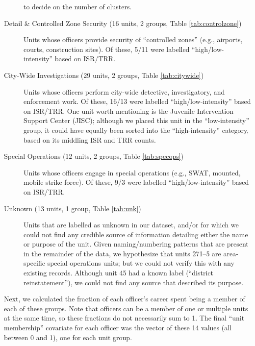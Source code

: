 \begin{description}
to decide on the number of clusters.
%
\item[Detail \& Controlled Zone Security (16 units, 2 groups, Table \ref{tab:controlzone}) ] Units whose officers
provide security of ``controlled zones'' (e.g., airports, courts, construction sites). Of these,
5/11 were labelled ``high/low-intensity'' {\color{red} based on ISR/TRR}.
%
\item[City-Wide Investigations (29 units, 2 groups, Table \ref{tab:citywide})] Units whose officers
perform city-wide detective, investigatory, and enforcement work. 
Of these, 16/13 were labelled ``high/low-intensity'' {\color{red} based on ISR/TRR}.
One unit worth mentioning is the Juvenile Intervention Support Center (JISC); although
we placed this unit in the ``low-intensity'' group, it 
could have equally been sorted into the ``high-intensity'' category, based
on its middling ISR and TRR counts.
%
\item[Special Operations (12 units, 2 groups, Table \ref{tab:specops})] Units whose officers
engage in special operations (e.g., SWAT, mounted, mobile strike force).
Of these, 9/3 were labelled ``high/low-intensity'' {\color{red} based on ISR/TRR}.
%
\item[Unknown (13 units, 1 group, Table \ref{tab:unk})] Units that are labelled as unknown in our dataset, and/or for which
we could not find any credible source of information detailing either the name or purpose of the unit. Given
naming/numbering patterns that are present in the remainder of the data, we hypothesize that units 271--5 are 
area-specific special operations units; but we could not verify this with any existing records. Although unit 45 had
a known label (``district reinstatement''), we could not find any source that described its purpose.

\end{description}



Next, we calculated the fraction of each officer's career spent being a member of
each of these groups. Note that officers can be a member of one or multiple units at the same time, so
these fractions do not necessarily sum to 1. The final ``unit membership'' covariate for each officer
was the vector of these 14 values (all between 0 and 1), one for each unit group.

